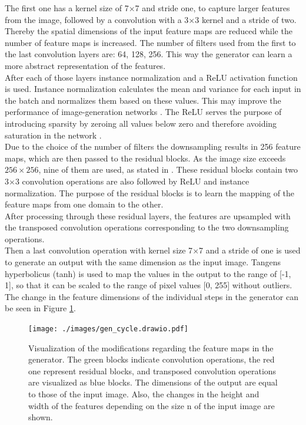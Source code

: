 The first one has a kernel size of 7$\times$7 and stride one, to capture larger features from the image, followed by a convolution with a 3$\times$3 kernel and a stride of two.
Thereby the spatial dimensions of the input feature maps are reduced while the number of feature maps is increased.
The number of filters used from the first to the last convolution layers are: 64, 128, 256.
This way the generator can learn a more abstract representation of the features.\\
After each of those layers instance normalization and a ReLU activation function is used.
Instance normalization calculates the mean and variance for each input in the batch and normalizes them based on these values.
This may improve the performance of image-generation networks \cite{Ulyanov2016}.
The ReLU serves the purpose of introducing sparsity by zeroing all values below zero and therefore avoiding saturation in the network \cite{Sharma2020}.\\
Due to the choice of the number of filters the downsampling results in 256 feature maps, which are then passed to the residual blocks.
As the image size exceeds $256\times256$, nine of them are used, as stated in \cite{Zhu2017}.
These residual blocks contain two 3$\times$3 convolution operations are also followed by ReLU and instance normalization.
The purpose of the residual blocks is to learn the mapping of the feature maps from one domain to the other.\\
After processing through these residual layers, the features are upsampled with the transposed convolution operations corresponding to the two downsampling operations.\\
Then a last convolution operation with kernel size 7$\times$7 and a stride of one is used to generate an output with the same dimension as the input image.
Tangens hyperbolicus (tanh) is used to map the values in the output to the range of [-1, 1], so that it can be scaled to the range of pixel values [0, 255] without outliers.
The change in the feature dimensions of the individual steps in the generator can be seen in Figure \ref{cycle_gen_fig}.
\begin{figure}[bt]
    \begin{center}
     \texttt{[image: ./images/gen\_cycle.drawio.pdf]}
    \caption[CycleGAN generator.]{{Visualization of the modifications regarding the feature maps in the generator.
    The green blocks indicate convolution operations, the red one represent residual blocks, and transposed convolution operations are visualized as blue blocks.
    The dimensions of the output are equal to those of the input image.
    Also, the changes in the height and width of the features depending on the size n of the input image are shown.
    }\label{cycle_gen_fig}}
    \end{center}
\end{figure}
